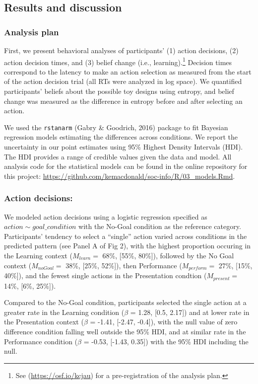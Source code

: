 \documentclass[10pt, letterpaper]{article}
\begin{document}
\subsection{Results and discussion}\label{results-and-discussion}

\subsubsection{Analysis plan}\label{analysis-plan}

First, we present behavioral analyses of participants' (1) action
decisions, (2) action decision times, and (3) belief change (i.e.,
learning).\footnote{See (\url{https://osf.io/kcjau}) for a
  pre-registration of the analysis plan.} Decision times correspond to
the latency to make an action selection as measured from the start of
the action decision trial (all RTs were analyzed in log space). We
quantified participants' beliefs about the possible toy designs using
entropy, and belief change was measured as the difference in entropy
before and after selecting an action.

We used the \texttt{rstanarm} (Gabry \& Goodrich, 2016) package to fit
Bayesian regression models estimating the differences across conditions.
We report the uncertainty in our point estimates using 95\% Highest
Density Intervals (HDI). The HDI provides a range of credible values
given the data and model. All analysis code for the statistical models
can be found in the online repository for this project:
\url{https://github.com/kemacdonald/soc-info/R/03_models.Rmd}.

\subsubsection{Action decisions:}\label{action-decisions}

We modeled action decisions using a logistic regression specified as
\texttt{$action \sim goal\_condition$} with the No-Goal condition as the
reference category. Participants' tendency to select a ``single'' action
varied across conditions in the predicted pattern (see Panel A of Fig
2), with the highest proportion occuring in the Learning context
(\(M_{learn} =\) 68\%, {[}55\%, 80\%{]}), followed by the No Goal
context (\(M_{noGoal} =\) 38\%, {[}25\%, 52\%{]}), then Performance
(\(M_{perform} =\) 27\%, {[}15\%, 40\%{]}), and the fewest single
actions in the Presentation condtion (\(M_{present} =\) 14\%, {[}6\%,
25\%{]}).

Compared to the No-Goal condition, participants selected the single
action at a greater rate in the Learning condition (\(\beta\) = 1.28,
{[}0.5, 2.17{]}) and at lower rate in the Presentation context
(\(\beta\) = -1.41, {[}-2.47, -0.4{]}), with the null value of zero
difference condition falling well outside the 95\% HDI, and at similar
rate in the Performance condition (\(\beta\) = -0.53, {[}-1.43, 0.35{]})
with the 95\% HDI including the null.
\end{document}
